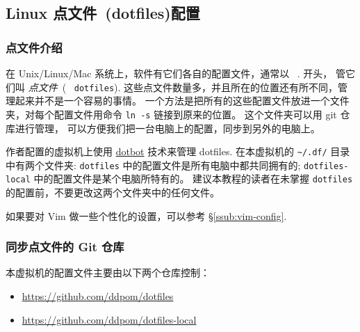 \documentclass[
    11pt,
    cite=authoryear,
    device=normal,
    lang=cn,
    mode=simple,
    result=answer,
    toc=onecol,
]{elegantbook_sierxue}
\begin{document}


\subsection{Linux 点文件~(dotfiles)配置}%
\label{sub:dotfiles-settings}

\subsubsection{点文件介绍}%
\label{ssub:dotfiles-settings-intro}

在 Unix/Linux/Mac 系统上，软件有它们各自的配置文件，通常以 ~.  开头，
管它们叫 \emph{点文件}~(~ \texttt{dotfiles}).
这些点文件数量多，并且所在的位置还有所不同，管理起来并不是一个容易的事情。
一个方法是把所有的这些配置文件放进一个文件夹，对每个配置文件用命令
\lstinline{ln -s} 链接到原来的位置。
这个文件夹可以用 git 仓库进行管理，
可以方便我们把一台电脑上的配置，同步到另外的电脑上。

作者配置的虚拟机上使用
\href{https://github.com/anishathalye/dotbot}{dotbot} 技术来管理 dotfiles.
在本虚拟机的 \lstinline{~/.df/} 目录中有两个文件夹: \lstinline{dotfiles}
中的配置文件是所有电脑中都共同拥有的; \lstinline{dotfiles-local}
中的配置文件是某个电脑所特有的。
建议本教程的读者在未掌握 \lstinline{dotfiles}
的配置前，不要更改这两个文件夹中的任何文件。
\begin{tip}\label{note:vim-customized}
    如果要对 Vim 做一些个性化的设置，可以参考 \S\ref{ssub:vim-config}.
\end{tip}


\subsubsection{同步点文件的 Git 仓库}%
\label{ssub:vbox-guest-ganx-conf}

本虚拟机的配置文件主要由以下两个仓库控制：
\begin{itemize}
    \item \href{https://github.com/ddpom/dotfiles}
        {https://github.com/ddpom/dotfiles}
    \item \href{https://github.com/ddpom/dotfiles-local}
        {https://github.com/ddpom/dotfiles-local}
\end{itemize}
\end{document}
